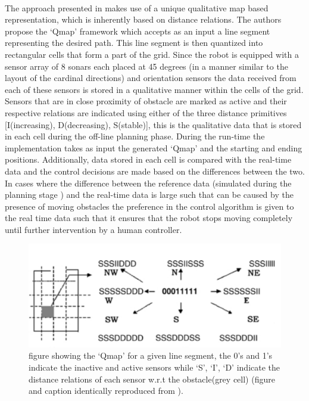 	\paragraph{}The approach presented in \cite{sgouros2002qualitative} makes use of a unique qualitative map based representation, which is inherently based on distance relations. The authors propose the `Qmap' framework which accepts as an input a line segment representing the desired path. This line segment is then quantized into rectangular cells that form a part of the grid. Since the robot is equipped with a sensor array of 8 sonars each placed at 45 degrees (in a manner similar to the layout of the cardinal directions) and orientation sensors the data received from each of these sensors is stored in a qualitative manner within the cells of the grid. Sensors that are in close proximity of obstacle are marked as active and their respective relations are indicated using either of the three distance primitives [I(increasing), D(decreasing), S(stable)], this is the qualitative data that is stored in each cell during the off-line planning phase. During the run-time the implementation takes as input the generated `Qmap' and the starting and ending positions. Additionally, data stored in each cell is compared with the real-time data and the control decisions are made based on the differences between the two. In cases where the difference between the reference data (simulated during the planning stage ) and the real-time data is large such that can be caused by the presence of moving obstacles the preference in the control algorithm is given to the real time data such that it ensures that the robot stops moving completely until further intervention by a human controller.
	\begin{figure}[h]
		\centering
		\includegraphics[scale=0.7]{images/Qmap}
		\caption{figure showing the `Qmap' for a given line segment, the 0's and 1's indicate the inactive and active sensors while `S', `I', `D' indicate the distance relations of each sensor w.r.t the obstacle(grey cell) (figure and caption identically reproduced from \cite{sgouros2002qualitative}).}
		\label{fig:qmap}
	\end{figure}
	
